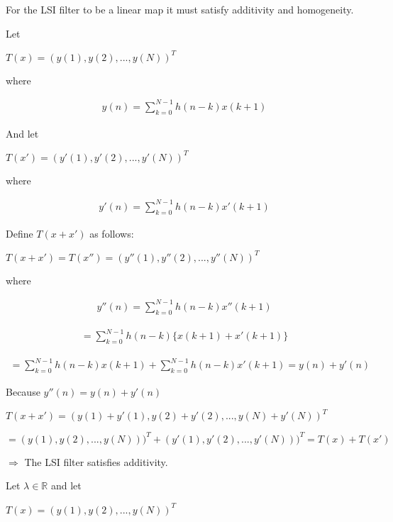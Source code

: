 \documentclass[fleqn]{article}
\begin{document}
\begin{enumerate}[nolistsep]
\begin{enumerate}
				For the LSI filter to be a linear map it must satisfy additivity and homogeneity.
			
				Let
			
				$T(x) = (y(1), y(2), ..., y(N))^T$
				
				where
				
				\begin{align*}
					y(n) = \sum_{k=0}^{N-1}{h(n-k)x(k+1)}
				\end{align*}
				
				And let
				
				$T(x') = (y'(1), y'(2), ..., y'(N))^T$
				
				where
				
				\begin{align*}
					y'(n) = \sum_{k=0}^{N-1}{h(n-k)x'(k+1)}
				\end{align*}
				
				Define $T(x + x')$ as follows:
				
				$T(x + x') = T(x'') = (y''(1), y''(2), ..., y''(N))^T$
				
				where
				
				\begin{align*}
					y''(n) = \sum_{k=0}^{N-1}{h(n-k)x''(k+1)}
				\end{align*}
				
				\vspace{-12pt}
				
				\begin{align*}
					= \sum_{k=0}^{N-1}{h(n-k)\{x(k+1) + x'(k+1)\}}
				\end{align*}
				
				\vspace{-12pt}
				
				\begin{align*}
					= \sum_{k=0}^{N-1}{h(n-k)x(k+1)} + \sum_{k=0}^{N-1}{h(n-k)x'(k+1)} = y(n) + y'(n)
				\end{align*}
				
				Because $y''(n) = y(n) + y'(n)$
				
				$T(x + x') = (y(1) + y'(1), y(2) + y'(2), ..., y(N) + y'(N))^T$
				
				$ = (y(1), y(2), ..., y(N)))^T + (y'(1), y'(2), ..., y'(N)))^T = T(x) + T(x')$
				
				$\Rightarrow$ The LSI filter satisfies additivity.
			
				Let $\lambda \in \mathbb{R}$ and let
				
				$T(x) = (y(1), y(2), ..., y(N))^T$
				

\end{enumerate}
\end{enumerate}
\end{document}
